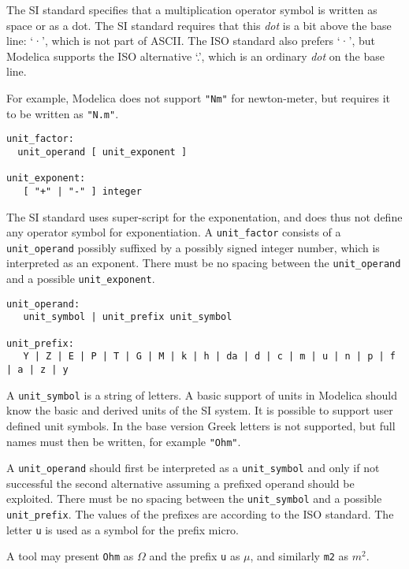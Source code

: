 The SI standard specifies that a multiplication operator symbol is written as space
or as a dot. The SI standard requires that this \emph{dot} is a bit above the base line: `·', which is not part of ASCII.
The ISO standard also prefers `·', but Modelica supports the ISO alternative `.', which is an ordinary \emph{dot} on the base line.

For example, Modelica does not support \lstinline!"Nm"! for newton-meter,
but requires it to be written as \lstinline!"N.m"!.

\begin{lstlisting}[language=grammar]
unit_factor:
  unit_operand [ unit_exponent ]

unit_exponent:
   [ "+" | "-" ] integer
\end{lstlisting}

The SI standard uses super-script for the exponentation, and does thus not define any operator symbol for exponentiation.
A \lstinline!unit_factor! consists of a \lstinline!unit_operand! possibly suffixed by a
possibly signed integer number, which is interpreted as an exponent.
There must be no spacing between the \lstinline!unit_operand! and a possible
\lstinline!unit_exponent!.

\begin{lstlisting}[language=grammar]
unit_operand:
   unit_symbol | unit_prefix unit_symbol

unit_prefix:
   Y | Z | E | P | T | G | M | k | h | da | d | c | m | u | n | p | f | a | z | y
\end{lstlisting}

A \lstinline!unit_symbol! is a string of letters. A basic support of units in
Modelica should know the basic and derived units of the SI system. It is
possible to support user defined unit symbols. In the base version Greek
letters is not supported, but full names must then be written, for
example \lstinline!"Ohm"!.

A \lstinline!unit_operand! should first be interpreted as a \lstinline!unit_symbol! and only
if not successful the second alternative assuming a prefixed operand
should be exploited. There must be no spacing between the \lstinline!unit_symbol!
and a possible \lstinline!unit_prefix!. The values of the prefixes are according to
the ISO standard. The letter \lstinline!u! is used as a symbol for the prefix
micro.

\begin{nonnormative}
A tool may present \lstinline!Ohm! as $\Omega$ and the prefix \lstinline!u! as $\mu$, and similarly \lstinline!m2! as $m^2$.
\end{nonnormative}

